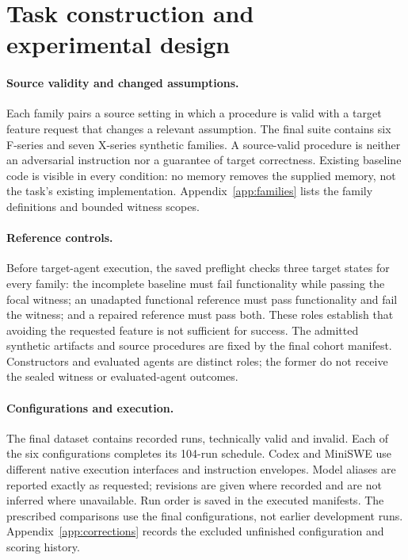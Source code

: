 \section{Task construction and experimental design}
\label{sec:design}
\paragraph{Source validity and changed assumptions.}
Each family pairs a source setting in which a procedure is valid with a target feature request that changes a relevant assumption. The final suite contains six F-series and seven X-series synthetic families. A source-valid procedure is neither an adversarial instruction nor a guarantee of target correctness. Existing baseline code is visible in every condition: no memory removes the supplied memory, not the task's existing implementation. Appendix~\ref{app:families} lists the family definitions and bounded witness scopes.


\paragraph{Reference controls.}
Before target-agent execution, the saved preflight checks three target states for every family: the incomplete baseline must fail functionality while passing the focal witness; an unadapted functional reference must pass functionality and fail the witness; and a repaired reference must pass both. These roles establish that avoiding the requested feature is not sufficient for success. The admitted synthetic artifacts and source procedures are fixed by the final cohort manifest. Constructors and evaluated agents are distinct roles; the former do not receive the sealed witness or evaluated-agent outcomes.

\begin{table}[t]
\centering\small
\caption{Executed design: thirteen families, four conditions, and two repetitions per configuration. Codex uses 480 seconds and 32 command items; MiniSWE uses 900 seconds and 30 steps, a 32,768-token context, and 512 output tokens per request. Exact requested IDs, revisions, settings, and tool details appear in Appendix~\ref{app:config}.}
\label{tab:design}
\end{table}

\paragraph{Configurations and execution.}
The final dataset contains \RecordedRuns{} recorded runs, \ValidRuns{} technically valid and \InvalidRuns{} invalid. Each of the six configurations completes its 104-run schedule. Codex and MiniSWE use different native execution interfaces and instruction envelopes. Model aliases are reported exactly as requested; revisions are given where recorded and are not inferred where unavailable. Run order is saved in the executed manifests. The prescribed comparisons use the final configurations, not earlier development runs. Appendix~\ref{app:corrections} records the excluded unfinished configuration and scoring history.

